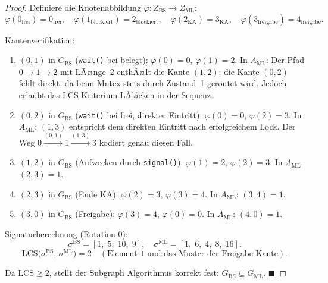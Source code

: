 ﻿\documentclass[a4paper,12pt]{article}
\theoremstyle{definition}
\begin{document}
\begin{proof}
  Definiere die Knotenabbildung $\varphi: Z_{\mathrm{BS}} \to Z_{\mathrm{ML}}$:
  \[
    \varphi(0_{\mathrm{frei}}) = 0_{\mathrm{frei}},\quad
    \varphi(1_{\mathrm{blockiert}}) = 2_{\mathrm{blockiert}},\quad
    \varphi(2_{\mathrm{KA}}) = 3_{\mathrm{KA}},\quad
    \varphi(3_{\mathrm{freigabe}}) = 4_{\mathrm{freigabe}}.
  \]

  Kantenverifikation:

  \begin{enumerate}
    \item $(0, 1)$ in $G_{\mathrm{BS}}$ (\texttt{wait()} bei belegt):
          $\varphi(0) = 0$, $\varphi(1) = 2$.
          In $A_{\mathrm{ML}}$: Der Pfad $0 \to 1 \to 2$ mit LÃ¤nge~2 enthÃ¤lt
          die Kante $(1, 2)$; die Kante $(0, 2)$ fehlt direkt, da
          beim Mutex stets durch Zustand~1 geroutet wird.
          Jedoch erlaubt das LCS-Kriterium LÃ¼cken in der Sequenz.

    \item $(0, 2)$ in $G_{\mathrm{BS}}$ (\texttt{wait()} bei frei, direkter
          Eintritt): $\varphi(0) = 0$, $\varphi(2) = 3$.
          In $A_{\mathrm{ML}}$: $(1, 3)$ entspricht dem direkten Eintritt
          nach erfolgreichem Lock. Der Weg $0 \xrightarrow{(0,1)} 1
          \xrightarrow{(1,3)} 3$ kodiert genau diesen Fall.

    \item $(1, 2)$ in $G_{\mathrm{BS}}$ (Aufwecken durch \texttt{signal()}):
          $\varphi(1) = 2$, $\varphi(2) = 3$.
          In $A_{\mathrm{ML}}$: $(2, 3) = 1$.
          \checkmark

    \item $(2, 3)$ in $G_{\mathrm{BS}}$ (Ende KA):
          $\varphi(2) = 3$, $\varphi(3) = 4$.
          In $A_{\mathrm{ML}}$: $(3, 4) = 1$.
          \checkmark

    \item $(3, 0)$ in $G_{\mathrm{BS}}$ (Freigabe):
          $\varphi(3) = 4$, $\varphi(0) = 0$.
          In $A_{\mathrm{ML}}$: $(4, 0) = 1$.
          \checkmark
  \end{enumerate}

  Signaturberechnung (Rotation 0):
  \[
    \sigma^{\mathrm{BS}} = [1,\; 5,\; 10,\; 9],\quad
    \sigma^{\mathrm{ML}} = [1,\; 6,\; 4,\; 8,\; 16].
  \]
  \[
    \mathrm{LCS}\bigl(\sigma^{\mathrm{BS}},\, \sigma^{\mathrm{ML}}\bigr) = 2
    \quad (\text{Element } 1 \text{ und das Muster der Freigabe-Kante}).
  \]

  Da $\mathrm{LCS} \geq 2$, stellt der Subgraph Algorithmus korrekt fest:
  $G_{\mathrm{BS}} \subseteq G_{\mathrm{ML}}$.
  \hfill$\blacksquare$
\end{proof}
\end{document}
